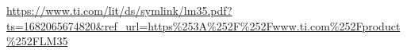 \usepackage{url}

\urldef\lmDat\url{https://www.ti.com/lit/ds/symlink/lm35.pdf?ts=1682065674820&ref_url=https%253A%252F%252Fwww.ti.com%252Fproduct%252FLM35}

